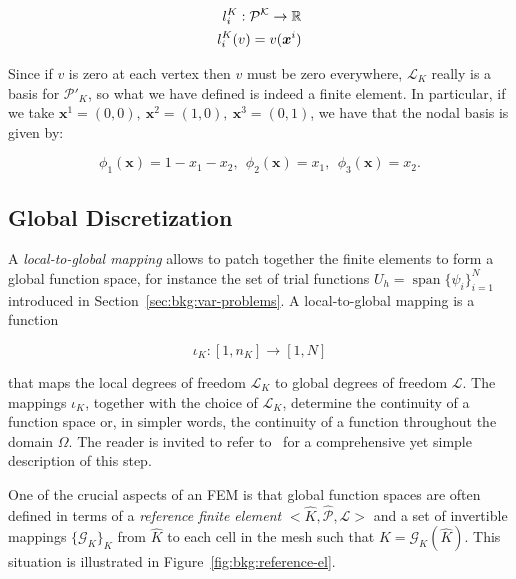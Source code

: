 \begin{equation}
\centering
\begin{split}
l_i^K : \mathcal{P^K} \rightarrow \mathbb{R} \\
l_i^K(v) = v(\boldsymbol{x}^i)
\end{split}
\end{equation}

Since if $v$ is zero at each vertex then $v$ must be zero everywhere, $\mathcal{L}_K$ really is a basis for $\mathcal{P}'_K$, so what we have defined is indeed a finite element. In particular, if we take $\boldsymbol{x}^1 = (0, 0),\ \boldsymbol{x}^2 = (1,0),\ \boldsymbol{x}^3 = (0,1)$, we have that the nodal basis is given by:

\begin{equation}
\phi_1(\boldsymbol{x}) = 1 - x_1 - x_2,\ \ \phi_2(\boldsymbol{x}) = x_1,\ \ \phi_3(\boldsymbol{x}) = x_2.
\end{equation}


\subsection{Global Discretization}
A {\em local-to-global mapping} allows to patch together the finite elements to form a global function space, for instance the set of trial functions $U_h = \operatorname{span}\lbrace \psi_i \rbrace_{i=1}^N$ introduced in Section~\ref{sec:bkg:var-problems}. A local-to-global mapping is a function

\begin{equation}
\iota_K : [1,n_K] \rightarrow [1,N]
\end{equation}

that maps the local degrees of freedom $\mathcal{L}_K$ to global degrees of freedom $\mathcal{L}$. The mappings $\iota_K$, together with the choice of $\mathcal{L}_K$, determine the continuity of a function space or, in simpler words, the continuity of a function throughout the domain $\Omega$. The reader is invited to refer to~\cite{fenics-book} for a comprehensive yet simple description of this step.

One of the crucial aspects of an FEM is that global function spaces are often defined in terms of a {\em reference finite element} ${<}\hat{K}, \hat{\mathcal{P}}, \hat{\mathcal{L}}{>}$ and a set of invertible mappings $\lbrace \mathcal{G}_K\rbrace_{K}$ from $\hat{K}$ to each cell in the mesh such that $K = \mathcal{G}_K(\hat{K})$.  This situation is illustrated in Figure~\ref{fig:bkg:reference-el}.

